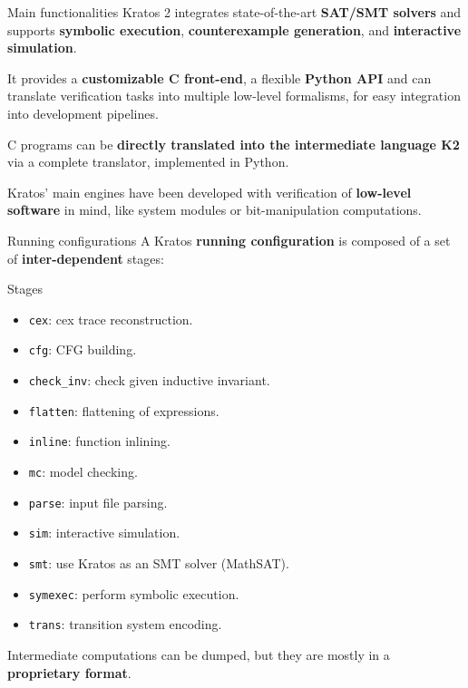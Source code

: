 \documentclass[aspectratio=1610,10.5pt]{beamer} %
\begin{document}
\begin{frame}{Main functionalities}
    Kratos 2 integrates state-of-the-art \textbf{SAT/SMT solvers} and supports \textbf{symbolic execution}, \textbf{counterexample generation}, and \textbf{interactive simulation}.

    \medskip

    It provides a \textbf{customizable C front-end}, a flexible \textbf{Python API} and can translate verification tasks into multiple low-level formalisms, for easy integration into development pipelines.

    \medskip

    C programs can be \textbf{directly translated into the intermediate language K2} via a complete translator, implemented in Python.

    \bigskip

    Kratos' main engines have been developed with verification of \textbf{low-level software} in mind, like system modules or bit-manipulation computations.
\end{frame}

\begin{frame}[fragile]{Running configurations}
    A Kratos \textbf{running configuration} is composed of a set of \textbf{inter-dependent} stages:

    \begin{block}{Stages}
        \begin{itemize}
            \item \texttt{cex}: cex trace reconstruction.
            \item \texttt{cfg}: CFG building.
            \item \texttt{check\_inv}: check given inductive invariant.
            \item \texttt{flatten}: flattening of expressions.
            \item \texttt{inline}: function inlining.
            \item \texttt{mc}: model checking.
            \item \texttt{parse}: input file parsing.
            \item \texttt{sim}: interactive simulation.
            \item \texttt{smt}: use Kratos as an SMT solver (MathSAT).
            \item \texttt{symexec}: perform symbolic execution.
            \item \texttt{trans}: transition system encoding.
        \end{itemize}
    \end{block}

    Intermediate computations can be dumped, but they are mostly in a \textbf{proprietary format}.
\end{frame}
\end{document}
